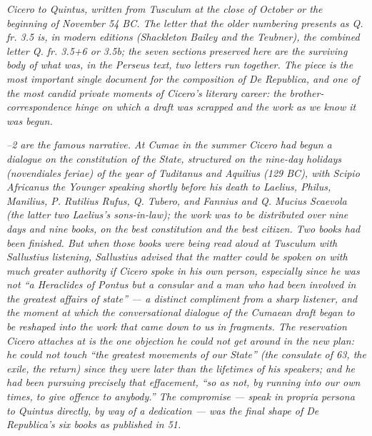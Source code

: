 
\textit{Cicero to Quintus, written from Tusculum at the close
of October or the beginning of November 54 BC. The letter
that the older numbering presents as Q. fr. 3.5 is, in modern
editions (Shackleton Bailey and the Teubner), the combined
letter Q. fr. 3.5+6 or 3.5b; the seven sections preserved
here are the surviving body of what was, in the Perseus
text, two letters run together. The piece is the most
important single document for the composition of
\textit{De Republica}, and one of the most candid private
moments of Cicero's literary career: the brother-correspondence
hinge on which a draft was scrapped and the work as we know
it was begun.}

\textit{\textsection{}--2 are the famous narrative.
At Cumae in the summer Cicero had begun a dialogue on the
constitution of the State, structured on the nine-day
holidays (\textit{novendiales feriae}) of the year of
Tuditanus and Aquilius (129 BC), with Scipio Africanus the
Younger speaking shortly before his death to Laelius, Philus,
Manilius, P. Rutilius Rufus, Q. Tubero, and Fannius and Q.
Mucius Scaevola (the latter two Laelius's sons-in-law); the
work was to be distributed over nine days and nine books, on
the best constitution and the best citizen. Two books had
been finished. But when those books were being read aloud at
Tusculum with Sallustius listening, Sallustius advised that
the matter could be spoken on with much greater authority if
Cicero spoke in his own person, especially since he was not
``a Heraclides of Pontus but a consular and a man who had
been involved in the greatest affairs of state'' --- a
distinct compliment from a sharp listener, and the moment at
which the conversational dialogue of the Cumaean draft began
to be reshaped into the work that came down to us in
fragments. The reservation Cicero attaches at 
is the one objection he could not get around in the new
plan: he could not touch ``the greatest movements of our
State'' (the consulate of 63, the exile, the return) since
they were later than the lifetimes of his speakers; and he
had been pursuing precisely that effacement, ``so as not, by
running into our own times, to give offence to anybody.''
The compromise --- speak in propria persona to Quintus
directly, by way of a dedication --- was the final shape of
\textit{De Republica}'s six books as published in 51.}

